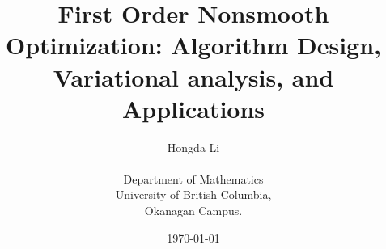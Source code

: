 \documentclass[12pt]{article}
\title{
    {
        \fontfamily{ptm}\selectfont 
        First Order Nonsmooth Optimization: 
        Algorithm Design, Variational analysis, and Applications
    }
}
\author{
    Hongda Li\\[3ex]\\ Department of Mathematics\\
	University of British Columbia,\\
	Okanagan Campus.
}
\date{\today}
\begin{document}

\maketitle
\tableofcontents
\pagebreak





\end{document}
